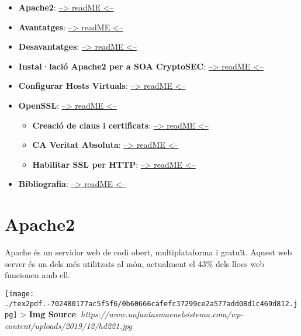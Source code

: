 \documentclass[]{article}
\begin{document}
\begin{itemize}
\item
  \textbf{Apache2}: \protect\hyperlink{apache2}{--\textgreater{} readME
  \textless{}--}
\item
  \textbf{Avantatges}: \protect\hyperlink{avantatges}{--\textgreater{}
  readME \textless{}--}
\item
  \textbf{Desavantatges}:
  \protect\hyperlink{desavantatges}{--\textgreater{} readME
  \textless{}--}
\item
  \textbf{Instal·lació Apache2 per a SOA CryptoSEC}:
  \protect\hyperlink{installaciuxf3-apache2-per-a-soa-cryptosec}{--\textgreater{}
  readME \textless{}--}
\item
  \textbf{Configurar Hosts Virtuals}:
  \protect\hyperlink{configurar-hosts-virtuals}{--\textgreater{} readME
  \textless{}--}
\item
  \textbf{OpenSSL}: \protect\hyperlink{openssl}{--\textgreater{} readME
  \textless{}--}

  \begin{itemize}
  \item
    \textbf{Creació de claus i certificats}:
    \protect\hyperlink{creaciuxf3-de-claus-i-certificats}{--\textgreater{}
    readME \textless{}--}
  \item
    \textbf{CA Veritat Absoluta}:
    \protect\hyperlink{ca-veritat-absoluta}{--\textgreater{} readME
    \textless{}--}
  \item
    \textbf{Habilitar SSL per HTTP}:
    \protect\hyperlink{habilitar-ssl-per-http}{--\textgreater{} readME
    \textless{}--}
  \end{itemize}
\item
  \textbf{Bibliografia}:
  \protect\hyperlink{bibliografia}{--\textgreater{} readME
  \textless{}--}
\end{itemize}

\hypertarget{apache2}{%
\section{\texorpdfstring{\textbf{Apache2}}{Apache2}}\label{apache2}}

Apache és un servidor web de codi obert, multiplataforma i gratuït.
Aquest web server és un dels més utilitzats al món, actualment el 43\%
dels llocs web funcionen amb ell.

\texttt{[image: ./tex2pdf.-702480177ac5f5f6/0b60666cafefc37299ce2a577add08d1c469d812.jpg]}
\textgreater{} \textbf{Img Source}:
\emph{https://www.unfantasmaenelsistema.com/wp-content/uploads/2019/12/hd221.jpg}
\end{document}
